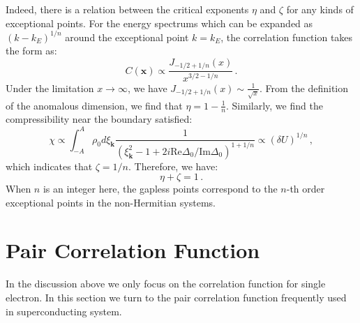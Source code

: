 \documentclass[aps,onecolumn,nofootinbib,superscriptaddress,notitlepage,longbibliography]{revtex4-1}
\begin{document}
Indeed, there is a relation between the critical exponents $\eta$
and $\zeta$ for any kinds of exceptional points. For the energy spectrums
which can be expanded as $(k-k_{E})^{1/n}$ around the exceptional
point $k=k_{E}$, the correlation function takes the form as: 
\begin{equation}
C(\bm{x})\propto\frac{J_{-1/2+1/n}(x)}{x^{3/2-1/n}}\,.
\end{equation}
Under the limitation $x\rightarrow\infty$, we have $J_{-1/2+1/n}(x)\sim\frac{1}{\sqrt{x}}$.
From the definition of the anomalous dimension, we find that $\eta=1-\frac{1}{n}$.
Similarly, we find the compressibility near the boundary satisfied:
\begin{equation}
\chi\propto\int_{-A}^{A}\rho_{0}d\xi_{\bm{k}}\frac{1}{(\xi_{\bm{k}}^{2}-1+2i\text{Re}\Delta_{0}/\text{Im}\Delta_{0})^{1+1/n}}\propto(\delta U)^{1/n}\,,
\end{equation}
which indicates that $\zeta=1/n$. Therefore, we have: 
\begin{equation}
\eta+\zeta=1\,.
\end{equation}
When $n$ is an integer here, the gapless points correspond to the
$n$-th order exceptional points in the non-Hermitian systems.

\section{Pair Correlation Function}

In the discussion above we only focus on the correlation function
for single electron. In this section we turn to the pair correlation
function frequently used in superconducting system.
\end{document}

